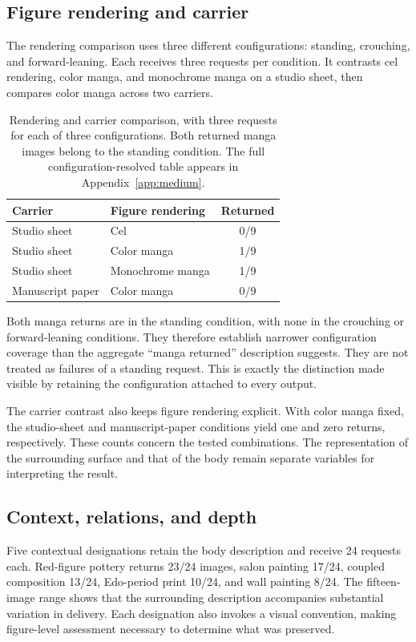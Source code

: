 \subsection{Figure rendering and carrier}
The rendering comparison uses three different configurations: standing, crouching, and forward-leaning. Each receives three requests per condition. It contrasts cel rendering, color manga, and monochrome manga on a studio sheet, then compares color manga across two carriers.

\begin{table}[t]
\centering\small
\begin{tabularx}{\linewidth}{@{}YYc@{}}
\toprule
Carrier & Figure rendering & Returned \\
\midrule
Studio sheet & Cel & 0/9 \\
Studio sheet & Color manga & 1/9 \\
Studio sheet & Monochrome manga & 1/9 \\
Manuscript paper & Color manga & 0/9 \\
\bottomrule
\end{tabularx}
\caption{Rendering and carrier comparison, with three requests for each of three configurations. Both returned manga images belong to the standing condition. The full configuration-resolved table appears in Appendix~\ref{app:medium}.}
\label{tab:rendering}
\end{table}

Both manga returns are in the standing condition, with none in the crouching or forward-leaning conditions. They therefore establish narrower configuration coverage than the aggregate ``manga returned'' description suggests. They are not treated as failures of a standing request. This is exactly the distinction made visible by retaining the configuration attached to every output.

The carrier contrast also keeps figure rendering explicit. With color manga fixed, the studio-sheet and manuscript-paper conditions yield one and zero returns, respectively. These counts concern the tested combinations. The representation of the surrounding surface and that of the body remain separate variables for interpreting the result.

\subsection{Context, relations, and depth}
Five contextual designations retain the body description and receive 24 requests each. Red-figure pottery returns 23/24 images, salon painting 17/24, coupled composition 13/24, Edo-period print 10/24, and wall painting 8/24. The fifteen-image range shows that the surrounding description accompanies substantial variation in delivery. Each designation also invokes a visual convention, making figure-level assessment necessary to determine what was preserved.

